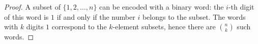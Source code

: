 

\setcounter{section}{3}
\setcounter{subsection}{1}
\setcounter{dfn}{3}

\begin{proof}
A subset of $\{1, 2, \ldots, n\}$ can be encoded with a binary word:
the $i$-th digit of this word is $1$ if and only if the number $i$ belongs to the subset.
The words with $k$ digits $1$ correspond to the $k$-element subsets, hence there are $\binom{n}{k}$ such words.
\end{proof}





